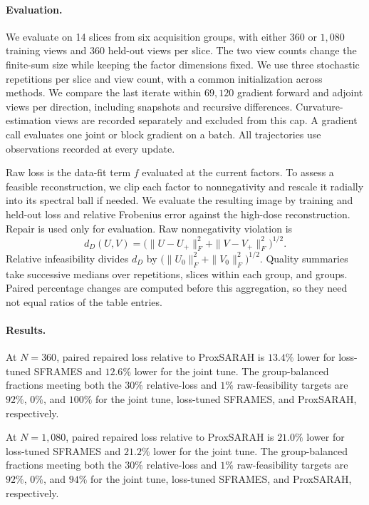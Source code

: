 \paragraph{Evaluation.}
We evaluate on 14 slices from six acquisition groups, with either \(360\)
or \(1{,}080\) training views and \(360\) held-out views per slice.
The two view counts change the finite-sum size while keeping the factor
dimensions fixed. We use three stochastic repetitions per slice and view
count, with a common initialization across methods.
We compare the last iterate within \(69{,}120\) gradient forward and
adjoint views per direction, including snapshots and recursive differences.
Curvature-estimation views are recorded separately and excluded from this cap.
A gradient call evaluates one joint or block gradient on a batch.
All trajectories use observations recorded at every update.

Raw loss is the data-fit term \(f\) evaluated at the current factors.
To assess a feasible reconstruction, we clip each factor to
nonnegativity and rescale it radially into its spectral ball if needed.
We evaluate the resulting image by training and held-out loss and relative
Frobenius error against the high-dose reconstruction.
Repair is used only for evaluation. Raw nonnegativity violation is
\[
 d_D(U,V)=\bigl(\|U-U_+\|_F^2+\|V-V_+\|_F^2\bigr)^{1/2}.
\]
Relative infeasibility divides \(d_D\) by
\(\bigl(\|U_0\|_F^2+\|V_0\|_F^2\bigr)^{1/2}\).
Quality summaries take successive medians over repetitions, slices within
each group, and groups. Paired percentage changes are computed before this
aggregation, so they need not equal ratios of the table entries.

\paragraph{Results.}
At \(N=360\), paired repaired loss relative to ProxSARAH
is \(13.4\%\) lower for loss-tuned SFRAMES and \(12.6\%\) lower for the joint tune.
The group-balanced fractions meeting both the \(30\%\) relative-loss
and \(1\%\) raw-feasibility targets are \(92\%\),
\(0\%\), and \(100\%\) for the joint tune,
loss-tuned SFRAMES, and ProxSARAH, respectively.

At \(N=1{,}080\), paired repaired loss relative to ProxSARAH
is \(21.0\%\) lower for loss-tuned SFRAMES and \(21.2\%\) lower for the joint tune.
The group-balanced fractions meeting both the \(30\%\) relative-loss
and \(1\%\) raw-feasibility targets are \(92\%\),
\(0\%\), and \(94\%\) for the joint tune,
loss-tuned SFRAMES, and ProxSARAH, respectively.

